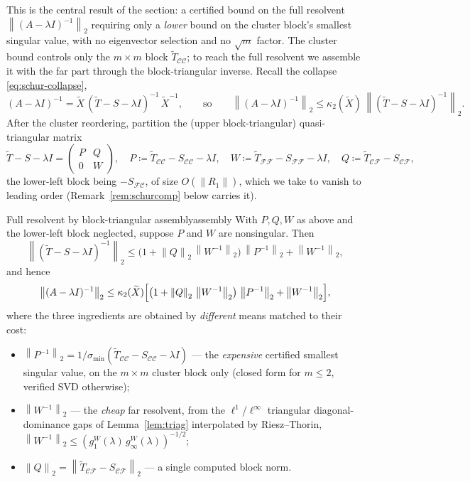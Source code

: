 \documentclass[11pt, a4paper]{article}
\numberwithin{equation}{section}
\newcommand{\norm}[1]{\left\|#1\right\|}
\newcommand{\tX}{\widetilde{X}}
\newcommand{\tT}{\widetilde{T}}
\begin{document}
This is the central result of the section: a certified bound on the full
resolvent $\norm{(A - \lambda I)^{-1}}_2$ requiring only a \emph{lower} bound on
the cluster block's smallest singular value, with no eigenvector selection and
no $\sqrt m$ factor.  The cluster bound controls only the $m\times m$ block
$\tT_{\mathcal{C}\mathcal{C}}$; to reach the full resolvent we assemble it with
the far part through the block-triangular inverse.  Recall the collapse
\eqref{eq:schur-collapse},
\[
  (A - \lambda I)^{-1} = \tX\,(\tT - S - \lambda I)^{-1}\,\tX^{-1},
  \qquad\text{so}\qquad
  \norm{(A - \lambda I)^{-1}}_2 \le \kappa_2(\tX)\,\norm{(\tT - S - \lambda I)^{-1}}_2.
\]
After the cluster reordering, partition the (upper block-triangular)
quasi-triangular matrix
\[
  \tT - S - \lambda I =
  \begin{pmatrix} P & Q \\ 0 & W \end{pmatrix},
  \quad
  P \coloneqq \tT_{\mathcal{C}\mathcal{C}} - S_{\mathcal{C}\mathcal{C}} - \lambda I,
  \quad
  W \coloneqq \tT_{\mathcal{F}\mathcal{F}} - S_{\mathcal{F}\mathcal{F}} - \lambda I,
  \quad
  Q \coloneqq \tT_{\mathcal{C}\mathcal{F}} - S_{\mathcal{C}\mathcal{F}},
\]
the lower-left block being $-S_{\mathcal{F}\mathcal{C}}$, of size $O(\norm{R_1})$,
which we take to vanish to leading order (Remark~\ref{rem:schurcomp} below
carries it).

\begin{theorem}{Full resolvent by block-triangular assembly}{assembly}
  With $P, Q, W$ as above and the lower-left block neglected, suppose $P$ and
  $W$ are nonsingular.  Then
  \[
    \norm{(\tT - S - \lambda I)^{-1}}_2
      \le \bigl(1 + \norm{Q}_2\,\norm{W^{-1}}_2\bigr)\,\norm{P^{-1}}_2
        + \norm{W^{-1}}_2,
  \]
  and hence
  \[
    \norm{(A - \lambda I)^{-1}}_2
      \le \kappa_2(\tX)\Bigl[\bigl(1 + \norm{Q}_2\,\norm{W^{-1}}_2\bigr)\,
        \norm{P^{-1}}_2 + \norm{W^{-1}}_2\Bigr],
  \]
  where the three ingredients are obtained by \emph{different} means matched to
  their cost:
  \begin{itemize}
    \item $\norm{P^{-1}}_2 = 1/\sigma_{\min}(\tT_{\mathcal{C}\mathcal{C}} -
      S_{\mathcal{C}\mathcal{C}} - \lambda I)$ --- the \emph{expensive} certified
      smallest singular value, on the $m\times m$ cluster block only
      \textup{(}closed form for $m\le 2$, verified SVD otherwise\textup{)};
    \item $\norm{W^{-1}}_2$ --- the \emph{cheap} far resolvent, from the
      $\ell^1$/$\ell^\infty$ triangular diagonal-dominance gaps of
      Lemma~\ref{lem:triag} interpolated by Riesz--Thorin,
      $\norm{W^{-1}}_2 \le (g^W_1(\lambda)\,g^W_\infty(\lambda))^{-1/2}$;
    \item $\norm{Q}_2 = \norm{\tT_{\mathcal{C}\mathcal{F}} -
      S_{\mathcal{C}\mathcal{F}}}_2$ --- a single computed block norm.
  \end{itemize}
\end{theorem}
\end{document}
